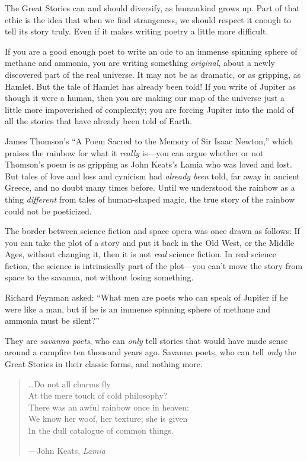 {
 The Great Stories can and should diversify, as humankind grows up.
Part of that ethic is the idea that when we find strangeness, we should
respect it enough to tell its story truly. Even if it makes writing
poetry a little more difficult.}

{
 If you are a good enough poet to write an ode to an immense
spinning sphere of methane and ammonia, you are writing something
\textit{original}, about a newly discovered part of the real universe.
It may not be as dramatic, or as gripping, as Hamlet. But the tale of
Hamlet has already been told! If you write of Jupiter as though it were
a human, then you are making our map of the universe just a little more
impoverished of complexity; you are forcing Jupiter into the mold of
all the stories that have already been told of Earth.}

{
 James Thomson's ``A Poem Sacred
to the Memory of Sir Isaac Newton,'' which praises
the rainbow for what it \textit{really} is---you can argue whether or
not Thomson's poem is as gripping as John
Keats's Lamia who was loved and lost. But tales of love
and loss and cynicism had \textit{already been} told, far away in
ancient Greece, and no doubt many times before. Until we understood the
rainbow as a thing \textit{different} from tales of human-shaped magic,
the true story of the rainbow could not be poeticized.}

{
 The border between science fiction and space opera was once drawn
as follows: If you can take the plot of a story and put it back in the
Old West, or the Middle Ages, without changing it, then it is not
\textit{real} science fiction. In real science fiction, the science is
intrinsically part of the plot---you can't move the
story from space to the savanna, not without losing something.}

{
 Richard Feynman asked: ``What men are poets who
can speak of Jupiter if he were like a man, but if he is an immense
spinning sphere of methane and ammonia must be
silent?''}

{
 They are \textit{savanna poets}, who can \textit{only} tell
stories that would have made sense around a campfire ten thousand years
ago. Savanna poets, who can tell \textit{only} the Great Stories in
their classic forms, and nothing more.}

\myendsectiontext


\bigskip


\begin{verse}
 \ldots Do not all charms fly\\
 At the mere touch of cold philosophy?\\
 There was an awful rainbow once in heaven:\\
 We know her woof, her texture; she is given\\
 In the dull catalogue of common things.\\
{\raggedleft
 {}---John Keats, \textit{Lamia}
\par}
\end{verse}

